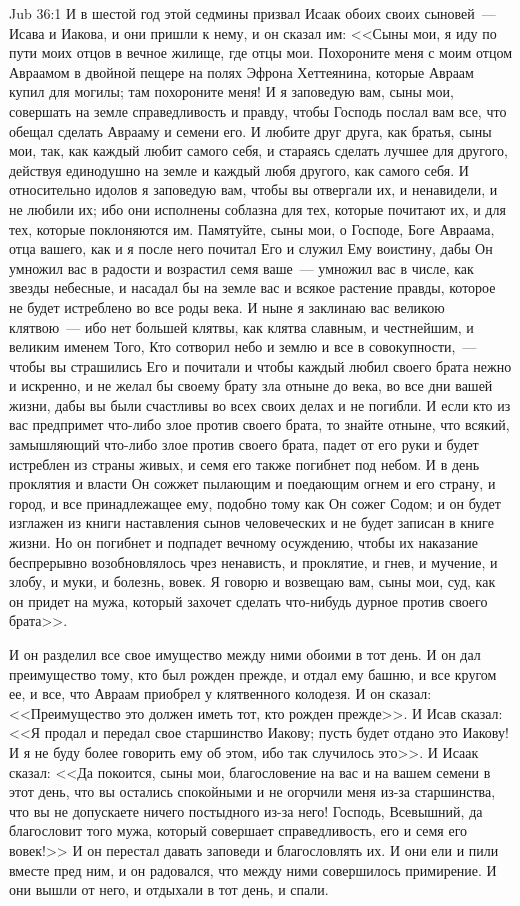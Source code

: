 \vs Jub 36:1
И в шестой год этой седмины призвал Исаак обоих
своих сыновей~--- Исава и Иакова, и они пришли к
нему, и он сказал им: <<Сыны мои, я иду по пути
моих отцов в вечное жилище, где отцы мои.
Похороните меня с моим отцом Авраамом в двойной
пещере на полях Эфрона Хеттеянина, которые
Авраам купил для могилы; там похороните меня! И я
заповедую вам, сыны мои, совершать на земле
справедливость и правду, чтобы Господь послал
вам все, что обещал сделать Аврааму и семени его.
И любите друг друга, как братья, сыны мои, так, как
каждый любит самого себя, и стараясь сделать
лучшее для другого, действуя единодушно на земле
и каждый любя другого, как самого себя. И
относительно идолов я заповедую вам, чтобы вы
отвергали их, и ненавидели, и не любили их; ибо они
исполнены соблазна для тех, которые почитают их,
и для тех, которые поклоняются им. Памятуйте, сыны
мои, о Господе, Боге Авраама, отца вашего, как и я
после него почитал Его и служил Ему воистину,
дабы Он умножил вас в радости и возрастил семя
ваше~--- умножил вас в числе, как звезды небесные, и
насадал бы на земле вас и всякое растение правды,
которое не будет истреблено во все роды века. И
ныне я заклинаю вас великою клятвою~--- ибо нет
большей клятвы, как клятва славным, и честнейшим,
и великим именем Того, Кто сотворил небо и землю и
все в совокупности,~--- чтобы вы страшились Его и
почитали и чтобы каждый любил своего брата нежно
и искренно, и не желал бы своему брату зла отныне
до века, во все дни вашей жизни, дабы вы были
счастливы во всех своих делах и не погибли. И если
кто из вас предпримет что-либо злое против своего
брата, то знайте отныне, что всякий, замышляющий
что-либо злое против своего брата, падет от его
руки и будет истреблен из страны живых, и семя его
также погибнет под небом. И в день проклятия и
власти Он сожжет пылающим и поедающим огнем и
его страну, и город, и все принадлежащее ему,
подобно тому как Он сожег Содом; и он будет
изглажен из книги наставления сынов
человеческих и не будет записан в книге жизни. Но
он погибнет и подпадет вечному осуждению, чтобы
их наказание беспрерывно возобновлялось чрез
ненависть, и проклятие, и гнев, и мучение, и злобу,
и муки, и болезнь, вовек. Я говорю и возвещаю вам,
сыны мои, суд, как он придет на мужа, который
захочет сделать что-нибудь дурное против своего
брата>>.

И он разделил все свое имущество между ними
обоими в тот день. И он дал преимущество тому, кто
был рожден прежде, и отдал ему башню, и все
кругом ее, и все, что Авраам приобрел у
клятвенного колодезя. И он сказал:
<<Преимущество это должен иметь тот, кто рожден
прежде>>. И Исав сказал: <<Я продал и передал
свое старшинство Иакову; пусть будет отдано это
Иакову! И я не буду более говорить ему об этом, ибо
так случилось это>>. И Исаак сказал: <<Да
покоится, сыны мои, благословение на вас и на
вашем семени в этот день, что вы остались
спокойными и не огорчили меня из-за старшинства,
что вы не допускаете ничего постыдного из-за
него! Господь, Всевышний, да благословит того
мужа, который совершает справедливость, его и
семя его вовек!>> И он перестал давать заповеди
и благословлять их. И они ели и пили вместе пред
ним, и он радовался, что между ними совершилось
примирение. И они вышли от него, и отдыхали в тот
день, и спали.

